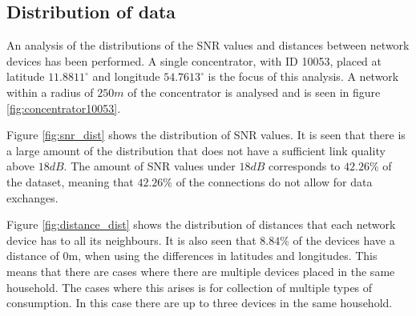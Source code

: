 \subsection{Distribution of data}
\label{sec:data_distribution}
An analysis of the distributions of the SNR values and distances between network devices has been performed. A single concentrator, with ID 10053, placed at latitude $11.8811^{\circ}$ and longitude $54.7613^{\circ}$ is the focus of this analysis. A network within a radius of $250m$ of the concentrator is analysed and is seen in figure \ref{fig:concentrator10053}.


Figure \ref{fig:snr_dist} shows the distribution of SNR values. It is seen that there is a large amount of the distribution that does not have a sufficient link quality above $18dB$. The amount of SNR values under $18dB$ corresponds to $42.26\%$ of the dataset, meaning that $42.26\%$ of the connections do not allow for data exchanges.



Figure \ref{fig:distance_dist} shows the distribution of distances that each network device has to all its neighbours. It is also seen that $8.84\%$ of the devices have a distance of $0$m, when using the differences in latitudes and longitudes. This means that there are cases where there are multiple devices placed in the same household. The cases where this arises is for collection of multiple types of consumption. In this case there are up to three devices in the same household.














